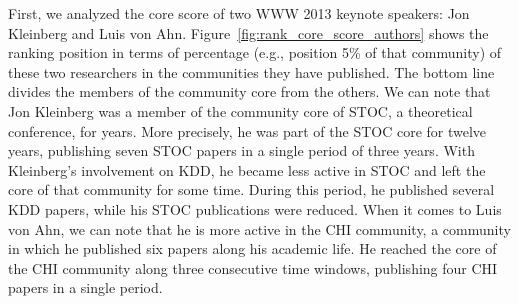 First, we analyzed the core score of two WWW 2013 keynote speakers: Jon Kleinberg and Luis von Ahn.  Figure~\ref{fig:rank_core_score_authors} shows the ranking position in terms of
percentage (e.g., position 5\% of that community) of these two researchers in the communities they have published. The bottom line divides the members of the community core from the others.
We can note that Jon Kleinberg was a member of the community core of STOC, a theoretical conference, for years. More precisely, he was part of the STOC core for twelve years,
publishing seven STOC papers in a single period of three years. With Kleinberg's involvement on KDD, he became less active in STOC and left the core of that community for some time.
During this period, he published several KDD papers, while his STOC publications were reduced.  When it comes to Luis von Ahn, we can note that he is more active in
the CHI community, a community in which he published six papers along his academic life. He reached the core of the CHI community along three consecutive time windows,
publishing four CHI papers in a single period.




